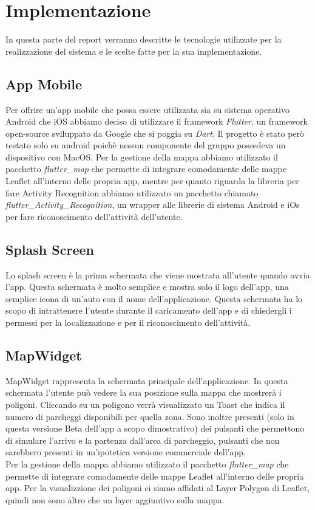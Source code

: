 \documentclass[../../Report.tex]{subfiles}
\begin{document}
\chapter{Implementazione}
\label{chap:Implementazione}
In questa parte del report verranno descritte le tecnologie utilizzate per la realizzazione del sistema e le scelte fatte per la sua implementazione.\\

\section{App Mobile}
    Per offrire un'app mobile che possa essere utilizzata sia su sistema operativo Android che iOS abbiamo deciso di utilizzare il framework \emph{Flutter}, un framework open-source sviluppato da Google che si poggia su \emph{Dart}. Il progetto è stato però testato solo su android poichè nessun componente del gruppo possedeva un dispositivo con MacOS. Per la gestione della mappa abbiamo utilizzato il pacchetto \emph{flutter\_map} che permette di integrare comodamente delle mappe Leaflet all'interno delle propria app, mentre per quanto riguarda la libreria per fare Activity Recognition abbiamo utilizzato un pacchetto chiamato \emph{flutter\_Activity\_Recognition}, un wrapper alle librerie di sistema Android e iOs per fare riconoscimento dell'attività dell'utente. \\
\section{Splash Screen}
Lo splash screen è la prima schermata che viene mostrata all'utente quando avvia l'app. Questa schermata è molto semplice e mostra solo il logo dell'app, una semplice icona di un'auto con il nome dell'applicazione. Questa schermata ha lo scopo di intrattenere l'utente durante il caricamento dell'app e di chiedergli i permessi per la localizzazione e per il riconoscimento dell'attività.\\

\section{MapWidget}
MapWidget rappresenta la schermata principale dell'applicazione. In questa schermata l'utente può vedere la sua posizione sulla mappa che mostrerà i poligoni. Cliccando su un poligono verrà visualizzato un Toast che indica il numero di parcheggi disponibili per quella zona. Sono inoltre presenti (solo in questa versione Beta dell'app a scopo dimostrativo) dei pulsanti che permettono di simulare l'arrivo e la partenza dall'area di parcheggio, pulsanti che non sarebbero presenti in un'ipotetica versione commerciale dell'app. \\ 
Per la gestione della mappa abbiamo utilizzato il pacchetto \emph{flutter\_map} che permette di integrare comodamente delle mappe Leaflet all'interno delle propria app. Per la visualizzione dei poligoni ci siamo affidati al Layer Polygon di Leaflet, quindi non sono altro che un layer aggiuntivo sulla mappa.\\ 
\end{document}
